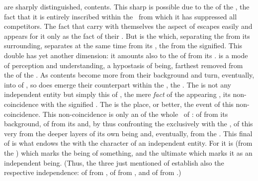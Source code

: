 \pa {} are sharply distinguished,  contents.  This
sharp  is possible due to the  of the
, the fact that it is entirely inscribed within the \hoa\ from which
it has suppressed all competitors.  The fact that  carry with
themselves the aspect of  escapes easily  and
appears for it only as the fact of their .  But 
is the  which, separating the  from its surrounding,
separates at the same time  from its , the 
from the signified.  This double  has yet another dimension: it
amounts also to the  of  from its .
 is a mode of perception and understanding, a hypostasis of
being, farthest removed from the  of the 
.  As contents become more   from
their background and turn, eventually, into  of , so does emerge their counterpart within the \hoa, the 
.  The   is not any independent entity but
simply this  of , the mere {\em fact} of the
 appearing , its non-coincidence with the
signified . The  is the place, or better, the
event of this non-coincidence. This non-coincidence is only an  of
the whole \nexus\ of : of  from its
background, of  from its  and, by thus confronting the
 exclusively with the , of this very
 from the deeper layers of its own being and, eventually, from the
.  This final  of  is what endows the
 with the character of an independent entity. For it is
 (from the ) which marks the being of something,
and the ultimate  which marks it as an independent being.
(Thus, the three just mentioned  of  establish also
the respective independence: of  from , of
 from , and of  from .)

